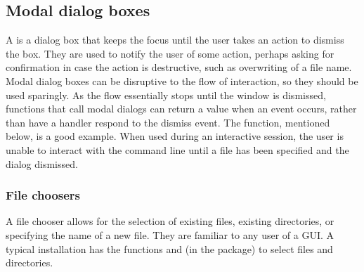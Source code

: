 







\subsection{Modal dialog boxes}
\label{sec:GUI:modal-dialogs}

A  is a dialog box that keeps the focus until
the user takes an action to dismiss the box. They are used to notify
the user of some action, perhaps asking for confirmation in case the
action is destructive, such as overwriting of a file name. Modal
dialog boxes can be disruptive to the flow of interaction, so they
should be used sparingly. As the flow essentially stops until the
window is dismissed, functions that call modal dialogs can return a
value when an event occurs, rather than have a handler respond to the
dismiss event. The  function, mentioned below, is
a good example. When used during an interactive \R\/ session, the user
is unable to interact with the command line until a file has been
specified and the dialog dismissed.


\subsubsection{File choosers}
\label{sec:GUI:file-choosers}

A file chooser allows for the selection of existing files, existing
directories, or specifying the name of a new file. They are familiar to
any user of a GUI. A typical \R\/ installation has the functions
 and  (in the
 package) to select files and directories.


